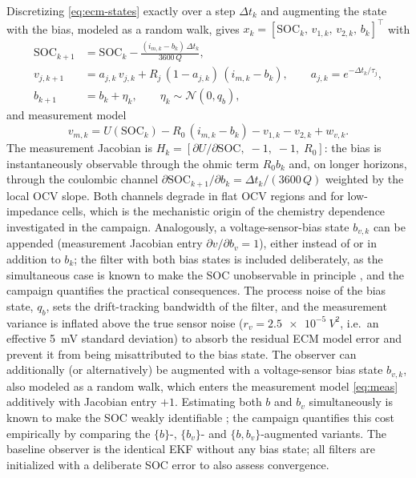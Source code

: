 \documentclass[11pt,a4paper]{article}
\newcommand{\soc}{\mathrm{SOC}}
\begin{document}
Discretizing \eqref{eq:ecm-states} exactly over a step $\Delta t_k$ and
augmenting the state with the bias, modeled as a random walk, gives
$x_k = [\soc_k,\, v_{1,k},\, v_{2,k},\, b_k]^\top$ with
\begin{align}
  \soc_{k+1} &= \soc_k - \frac{(i_{m,k} - b_k)\,\Delta t_k}{3600\,Q}, \\
  v_{j,k+1} &= a_{j,k}\, v_{j,k} + R_j\,(1 - a_{j,k})\,(i_{m,k} - b_k),
  \qquad a_{j,k} = e^{-\Delta t_k / \tau_j}, \\
  b_{k+1} &= b_k + \eta_k, \qquad \eta_k \sim \mathcal{N}(0, q_b),
\end{align}
and measurement model
\begin{equation}
  v_{m,k} = U(\soc_k) - R_0\,(i_{m,k} - b_k) - v_{1,k} - v_{2,k} + w_{v,k}.
  \label{eq:meas}
\end{equation}
The measurement Jacobian is
$H_k = [\partial U/\partial\soc,\; -1,\; -1,\; R_0]$: the bias is
instantaneously observable through the ohmic term $R_0 b_k$ and, on longer
horizons, through the coulombic channel
$\partial \soc_{k+1}/\partial b_k = \Delta t_k / (3600\,Q)$ weighted by the
local OCV slope. Both channels degrade in flat OCV regions and for
low-impedance cells, which is the mechanistic origin of the
chemistry dependence investigated in the campaign. Analogously, a voltage-sensor-bias state $b_{v,k}$ can be
appended (measurement Jacobian entry $\partial v / \partial b_v = 1$),
either instead of or in addition to $b_k$; the filter with both bias states
is included deliberately, as the simultaneous case is known to make the SOC
unobservable in principle \citep{zhao2017observability}, and the campaign
quantifies the practical consequences. The process noise of
the bias state, $q_b$, sets the drift-tracking bandwidth of the filter, and
the measurement variance is inflated above the true sensor noise
($r_v = \SI{2.5e-5}{V^2}$, i.e.\ an effective \SI{5}{mV} standard
deviation) to absorb the residual ECM model error and prevent it from being
misattributed to the bias state. The observer can additionally (or alternatively) be augmented with a
voltage-sensor bias state $b_{v,k}$, also modeled as a random walk, which
enters the measurement model \eqref{eq:meas} additively with Jacobian
entry $+1$. Estimating both $b$ and $b_v$ simultaneously is known to make
the SOC weakly identifiable \citep{zhao2017observability}; the campaign
quantifies this cost empirically by comparing the $\{b\}$-,
$\{b_v\}$- and $\{b, b_v\}$-augmented variants. The baseline observer
is the identical EKF without any bias state; all filters are initialized
with a deliberate SOC error to also assess convergence.
\end{document}
